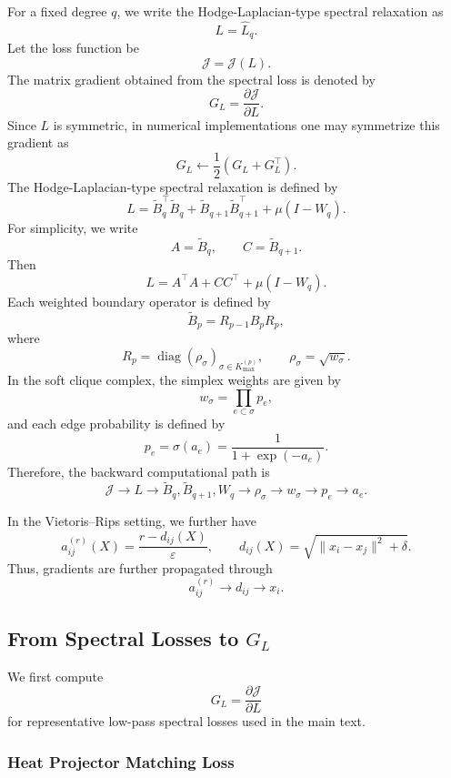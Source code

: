 \documentclass[pdflatex,sn-mathphys-ay]{sn-jnl}%
\theoremstyle{thmstyleone}%
\theoremstyle{thmstyletwo}%
\theoremstyle{thmstylethree}%
\begin{document}
\begin{appendices}
For a fixed degree \(q\), we write the Hodge-Laplacian-type spectral relaxation as
\[
L
=
\widehat{L}_q.
\]
Let the loss function be
\[
\mathcal{J}
=
\mathcal{J}(L).
\]
The matrix gradient obtained from the spectral loss is denoted by
\[
G_L
=
\frac{\partial \mathcal{J}}{\partial L}.
\]
Since \(L\) is symmetric, in numerical implementations one may symmetrize this gradient as
\[
G_L
\leftarrow
\frac{1}{2}
\left(
G_L+G_L^\top
\right).
\]
The Hodge-Laplacian-type spectral relaxation is defined by
\[
L
=
\widetilde{B}_q^\top \widetilde{B}_q
+
\widetilde{B}_{q+1}\widetilde{B}_{q+1}^\top
+
\mu(I-W_q).
\]
For simplicity, we write
\[
A=\widetilde{B}_q,
\qquad
C=\widetilde{B}_{q+1}.
\]
Then
\[
L
=
A^\top A
+
CC^\top
+
\mu(I-W_q).
\]
Each weighted boundary operator is defined by
\[
\widetilde{B}_p
=
R_{p-1}B_pR_p,
\]
where
\[
R_p
=
\operatorname{diag}(\rho_\sigma)_{\sigma\in K_{\max}^{(p)}},
\qquad
\rho_\sigma
=
\sqrt{w_\sigma}.
\]
In the soft clique complex, the simplex weights are given by
\[
w_\sigma
=
\prod_{e\subset\sigma}p_e,
\]
and each edge probability is defined by
\[
p_e=\sigma(a_e)
=
\frac{1}{1+\exp(-a_e)}.
\]
Therefore, the backward computational path is
\[
\mathcal{J}
\longrightarrow
L
\longrightarrow
\widetilde{B}_q,\widetilde{B}_{q+1},W_q
\longrightarrow
\rho_\sigma
\longrightarrow
w_\sigma
\longrightarrow
p_e
\longrightarrow
a_e.
\]

In the Vietoris--Rips setting, we further have
\[
a_{ij}^{(r)}(X)
=
\frac{r-d_{ij}(X)}{\varepsilon},
\qquad
d_{ij}(X)
=
\sqrt{
\|x_i-x_j\|^2+\delta
}.
\]
Thus, gradients are further propagated through
\[
a_{ij}^{(r)}
\longrightarrow
d_{ij}
\longrightarrow
x_i.
\]

\subsection{From Spectral Losses to \(G_L\)}

We first compute
\[
G_L
=
\frac{\partial\mathcal{J}}{\partial L}
\]
for representative low-pass spectral losses used in the main text.

\subsubsection{Heat Projector Matching Loss}


\end{appendices}
\end{document}
